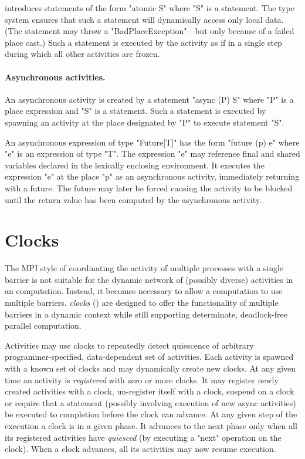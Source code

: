 \Xten{} introduces statements of the form \xcd"atomic S" where \xcd"S"
is a statement.  The type system ensures that such a statement will
dynamically access only local data. (The statement may throw
a \xcd"BadPlaceException"---but only because of a failed place cast.)
Such a statement is executed by the activity as if in a single step
during which all other activities are frozen.

\paragraph{Asynchronous activities.}

An asynchronous activity is created by a statement \xcd"async (P) S"
where \xcd"P" is a place expression and \xcd"S" is a statement.  Such
a statement is executed by spawning an activity at the place
designated by \xcd"P" to execute statement \xcd"S".

An asynchronous expression of type \xcd"Future[T]" has the form
\xcd"future (p) e" where \xcd"e" is an expression of type
\xcd"T".  The expression \xcd"e"
may reference final and shared variables declared in the lexically
enclosing environment.  It executes the expression \xcd"e" at the
place \xcd"p" as an asynchronous activity, immediately returning with
a future. The future may later be forced causing the activity to be
blocked until the return value has been computed by the asynchronous
activity.

\section{Clocks}
The MPI style of coordinating the activity of multiple processes with
a single barrier is not suitable for the dynamic network of (possibly
diverse) activities in an \Xten{} computation. Instead, it becomes
necessary to allow a computation to use multiple barriers. \Xten{}
\emph{clocks} () are designed to offer the
functionality of multiple barriers in a dynamic context while still
supporting determinate, deadlock-free parallel computation.

Activities may use clocks to repeatedly detect quiescence of arbitrary
programmer-specified, data-dependent set of activities. Each activity
is spawned with a known set of clocks and may dynamically create new
clocks. At any given time an activity is \emph{registered} with zero or
more clocks. It may register newly created activities with a clock,
un-register itself with a clock, suspend on a clock or require that a
statement (possibly involving execution of new async activities) be
executed to completion before the clock can advance.  At any given
step of the execution a clock is in a given phase. It advances to the
next phase only when all its registered activities have \emph{quiesced}
(by executing a \xcd"next" operation on the clock).
When a clock advances, all its activities may now resume execution.

